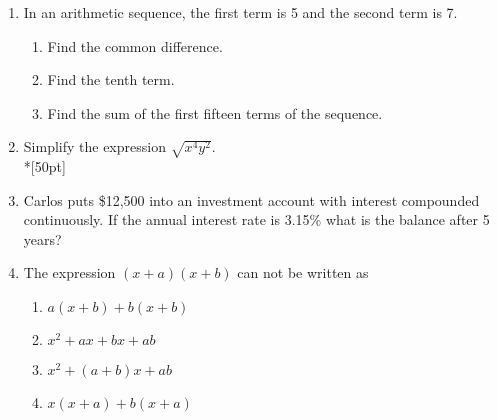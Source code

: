 \documentclass[12pt, oneside]{article}
\begin{document}
\begin{enumerate}

\item In an arithmetic sequence, the first term is 5 and the second term is 7.
\begin{enumerate}
    \item Find the common difference.
        \begin{flushright}[2]\end{flushright}
    \item Find the tenth term.\\[50pt]
        \begin{flushright}[2]\end{flushright}
    \item Find the sum of the first fifteen terms of the sequence. \\[50pt]
        \begin{flushright}[2]\end{flushright}
\end{enumerate}

\item Simplify the expression $\sqrt{x^4 y^2}$.\\*[50pt]
        \begin{flushright}[2]\end{flushright}

\item Carlos puts \$12,500 into an investment account with interest compounded continuously. If the annual interest rate is 3.15\% what is the balance after 5 years? %
        \begin{flushright}[5]\end{flushright}

\item The expression $(x + a)(x + b)$ can not be written as
\begin{enumerate}
    \item $a(x + b)+ b(x + b)$
    \item $x^2 + ax + bx + ab$ 
    \item  $x^2 + (a + b)x + ab$  
    \item $x(x + a)+ b(x + a)$
\end{enumerate}
        \begin{flushright}[2]\end{flushright}


\end{enumerate}
\end{document}
